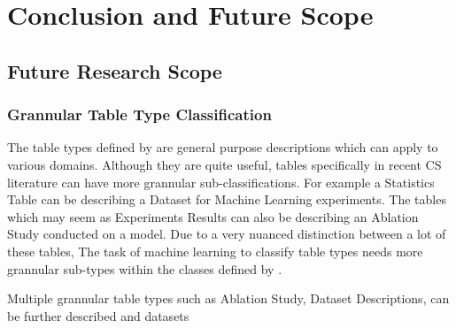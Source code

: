 \chapter{Conclusion and Future Scope}
\label{conclusion}

\section{Future Research Scope}
\label{conclusion:future-scope}
\subsection{Grannular Table Type Classification}
\label{conclusion:future-scope:type-class}

The table types defined by \cite{kim2012scientific} are general purpose descriptions which can apply to various domains. Although they are quite useful, tables specifically in recent CS literature can have more grannular sub-classifications. For example a Statistics Table can be describing a Dataset for Machine Learning experiments. The tables which may seem as Experiments Results can also be describing an Ablation Study conducted on a model. Due to a very nuanced distinction between a lot of these tables, The task of machine learning to classify table types needs more grannular sub-types within the classes defined by \cite{kim2012scientific}. 

Multiple grannular table types such as Ablation Study, Dataset Descriptions, can be further described and datasets